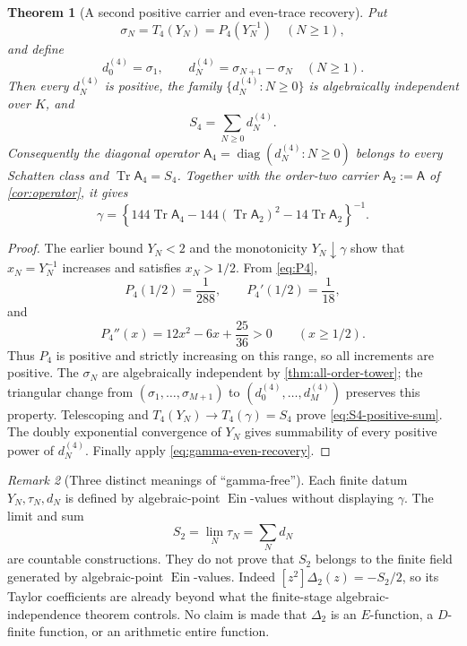 \documentclass[11pt]{article}
\newtheorem{theorem}{Theorem}[section]
\theoremstyle{definition}
\theoremstyle{remark}
\newtheorem{remark}[theorem]{Remark}
\newcommand{\Ein}{\operatorname{Ein}}
\newcommand{\Tr}{\operatorname{Tr}}
\newcommand{\diag}{\operatorname{diag}}
\begin{document}
\begin{theorem}[A second positive carrier and even-trace recovery]
\label{thm:positive-S4-carrier}
Put
\[
 \sigma_N=T_4(Y_N)=P_4(Y_N^{-1})\quad(N\ge1),
\]
and define
\[
 d_0^{(4)}=\sigma_1,\qquad
 d_N^{(4)}=\sigma_{N+1}-\sigma_N\quad(N\ge1).
\]
Then every \(d_N^{(4)}\) is positive, the family
\(\{d_N^{(4)}:N\ge0\}\) is algebraically independent over \(K\), and
\begin{equation}\label{eq:S4-positive-sum}
 S_4=\sum_{N\ge0}d_N^{(4)}.
\end{equation}
Consequently the diagonal operator
\(\mathsf A_4=\diag(d_N^{(4)}:N\ge0)\) belongs to every Schatten class and
\(\Tr\mathsf A_4=S_4\).  Together with the order-two carrier
\(\mathsf A_2:=\mathsf A\) of \cref{cor:operator}, it gives
\begin{equation}\label{eq:gamma-two-positive-carriers}
 \boxed{\displaystyle
 \gamma=
 \left\{144\Tr\mathsf A_4
 -144(\Tr\mathsf A_2)^2-14\Tr\mathsf A_2\right\}^{-1}.}
\end{equation}
\end{theorem}

\begin{proof}
The earlier bound \(Y_N<2\) and the monotonicity \(Y_N\downarrow\gamma\)
show that \(x_N=Y_N^{-1}\) increases and satisfies \(x_N>1/2\).  From
\eqref{eq:P4},
\[
 P_4(1/2)=\frac1{288},\qquad P_4'(1/2)=\frac1{18},
\]
and
\[
 P_4''(x)=12x^2-6x+\frac{25}{36}>0\qquad(x\ge1/2).
\]
Thus \(P_4\) is positive and strictly increasing on this range, so all
increments are positive.  The \(\sigma_N\) are algebraically
independent by \cref{thm:all-order-tower}; the triangular change from
\((\sigma_1,\ldots,\sigma_{M+1})\) to
\((d_0^{(4)},\ldots,d_M^{(4)})\) preserves this property.  Telescoping and
\(T_4(Y_N)\to T_4(\gamma)=S_4\) prove
\eqref{eq:S4-positive-sum}.  The doubly exponential convergence of \(Y_N\)
gives summability of every positive power of \(d_N^{(4)}\).  Finally apply
\eqref{eq:gamma-even-recovery}.
\end{proof}

\begin{remark}[Three distinct meanings of ``gamma-free'']
Each finite datum \(Y_N,\tau_N,d_N\) is defined by algebraic-point
\(\Ein\)-values without displaying \(\gamma\).  The limit and sum
\[
 S_2=\lim_N\tau_N=\sum_Nd_N
\]
are countable constructions.  They do not prove that \(S_2\) belongs to the
finite field generated by algebraic-point \(\Ein\)-values.  Indeed
\([z^2]\Delta_2(z)=-S_2/2\), so its Taylor coefficients are already beyond
what the finite-stage algebraic-independence theorem controls.  No claim is
made that \(\Delta_2\) is an \(E\)-function, a \(D\)-finite function, or an
arithmetic entire function.
\end{remark}
\end{document}
